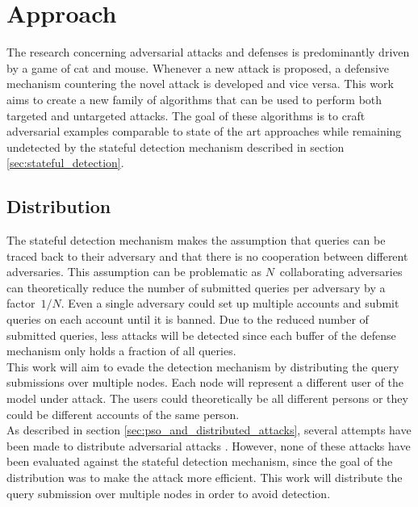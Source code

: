 \chapter{Approach}
The research concerning adversarial attacks and defenses is predominantly driven by a game of cat and mouse. Whenever a new attack is proposed, a defensive mechanism countering the novel attack is developed and vice versa. This work aims to create a new family of algorithms that can be used to perform both targeted and untargeted attacks. The goal of these algorithms is to craft adversarial examples comparable to state of the art approaches while remaining undetected by the stateful detection mechanism \cite{chen_stateful_2019} described in section \ref{sec:stateful_detection}.

\section{Distribution}
The stateful detection mechanism \cite{chen_stateful_2019} makes the assumption that queries can be traced back to their adversary and that there is no cooperation between different adversaries. This assumption can be problematic as $N$~collaborating adversaries can theoretically reduce the number of submitted queries per adversary by a factor~$1/N$. Even a single adversary could set up multiple accounts and submit queries on each account until it is banned. Due to the reduced number of submitted queries, less attacks will be detected since each buffer of the defense mechanism only holds a fraction of all queries.\\

This work will aim to evade the detection mechanism by distributing the query submissions over multiple nodes. Each node will represent a different user of the model under attack. The users could theoretically be all different persons or they could be different accounts of the same person.\\

As described in section \ref{sec:pso_and_distributed_attacks}, several attempts have been made to distribute adversarial attacks \cite{distributed_pso_attack, suryanto2020}. However, none of these attacks have been evaluated against the stateful detection mechanism, since the goal of the distribution was to make the attack more efficient. This work will distribute the query submission over multiple nodes in order to avoid detection.\\

